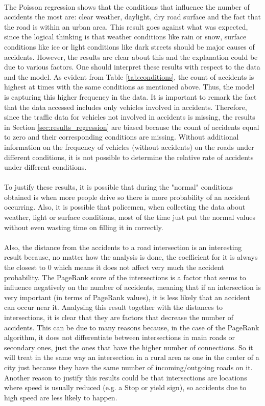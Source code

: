 \\
The Poisson regression shows that the conditions that influence the number of accidents the most are: clear weather, daylight, dry road surface and the fact that the road is within an urban area. 
This result goes against what was expected, since the logical thinking is that weather conditions like rain or snow, surface conditions like ice or light conditions like dark streets should be major causes of accidents. However, the results are clear about this and the explanation could be due to various factors. One should interpret these results with respect to the data and the model. As evident from Table \ref{tab:conditions}, the count of accidents is highest at times with the same conditions as mentioned above. Thus, the model is capturing this higher frequency in the data. It is important to remark the fact that the data accessed includes only vehicles involved in accidents. Therefore, since the traffic data for vehicles not involved in accidents is missing, the results in Section \ref{sec:results_regression} are biased because the count of accidents equal to zero and their corresponding conditions are missing.
Without additional information on the frequency of vehicles (without accidents) on the roads under different conditions, it is not possible to determine the relative rate of accidents under different conditions.
\\
\\
To justify these results, it is possible that during the "normal" conditions obtained is when more people drive so there is more probability of an accident occurring. Also, it is possible that policemen, when collecting the data about weather, light or surface conditions, most of the time just put the normal values without even wasting time on filling it in correctly.
\\
\\
Also, the distance from the accidents to a road intersection is an interesting result because, no matter how the analysis is done, the coefficient for it is always the closest to 0 which means it does not affect very much the accident probability. The PageRank score of the intersections is a factor that seems to influence negatively on the number of accidents, meaning that if an intersection is very important (in terms of PageRank values), it is less likely that an accident can occur near it. Analysing this result together with the distances to intersections, it is clear that they are factors that decrease the number of accidents. This can be due to many reasons because, in the case of the PageRank algorithm, it does not differentiate between intersections in main roads or secondary ones, just the ones that have the higher number of connections. So it will treat in the same way an intersection in a rural area as one in the center of a city just because they have the same number of incoming/outgoing roads on it. Another reason to justify this results could be that intersections are locations where speed is usually reduced (e.g. a Stop or yield sign), so accidents due to high speed are less likely to happen.
